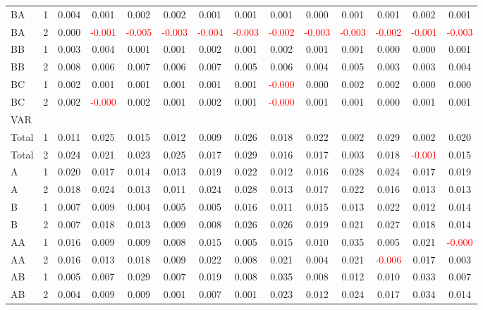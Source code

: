 \begin{table}[!htb]
{\begin{tabular}{llcccccccccccc}
BA & 1 & 0.004 & 0.001 & 0.002 & 0.002 & 0.001 & 0.001 & 0.001 & 0.000 & 0.001 & 0.001 & 0.002 & 0.001\\
BA & 2 & 0.000 & \textcolor{red}{-0.001} & \textcolor{red}{-0.005} & \textcolor{red}{-0.003} & \textcolor{red}{-0.004} & \textcolor{red}{-0.003} & \textcolor{red}{-0.002} & \textcolor{red}{-0.003} & \textcolor{red}{-0.003} & \textcolor{red}{-0.002} & \textcolor{red}{-0.001} & \textcolor{red}{-0.003}\\
BB & 1 & 0.003 & 0.004 & 0.001 & 0.001 & 0.002 & 0.001 & 0.002 & 0.001 & 0.001 & 0.000 & 0.000 & 0.001\\
BB & 2 & 0.008 & 0.006 & 0.007 & 0.006 & 0.007 & 0.005 & 0.006 & 0.004 & 0.005 & 0.003 & 0.003 & 0.004\\
BC & 1 & 0.002 & 0.001 & 0.001 & 0.001 & 0.001 & 0.001 & \textcolor{red}{-0.000} & 0.000 & 0.002 & 0.002 & 0.000 & 0.000\\
BC & 2 & 0.002 & \textcolor{red}{-0.000} & 0.002 & 0.001 & 0.002 & 0.001 & \textcolor{red}{-0.000} & 0.001 & 0.001 & 0.000 & 0.001 & 0.001\\
\hline
VAR &  &  &  &  &  &  &  &  &  &  &  &  & \\
\hline
Total & 1 & 0.011 & 0.025 & 0.015 & 0.012 & 0.009 & 0.026 & 0.018 & 0.022 & 0.002 & 0.029 & 0.002 & 0.020\\
Total & 2 & 0.024 & 0.021 & 0.023 & 0.025 & 0.017 & 0.029 & 0.016 & 0.017 & 0.003 & 0.018 & \textcolor{red}{-0.001} & 0.015\\
A & 1 & 0.020 & 0.017 & 0.014 & 0.013 & 0.019 & 0.022 & 0.012 & 0.016 & 0.028 & 0.024 & 0.017 & 0.019\\
A & 2 & 0.018 & 0.024 & 0.013 & 0.011 & 0.024 & 0.028 & 0.013 & 0.017 & 0.022 & 0.016 & 0.013 & 0.013\\
B & 1 & 0.007 & 0.009 & 0.004 & 0.005 & 0.005 & 0.016 & 0.011 & 0.015 & 0.013 & 0.022 & 0.012 & 0.014\\
B & 2 & 0.007 & 0.018 & 0.013 & 0.009 & 0.008 & 0.026 & 0.026 & 0.019 & 0.021 & 0.027 & 0.018 & 0.014\\
AA & 1 & 0.016 & 0.009 & 0.009 & 0.008 & 0.015 & 0.005 & 0.015 & 0.010 & 0.035 & 0.005 & 0.021 & \textcolor{red}{-0.000}\\
AA & 2 & 0.016 & 0.013 & 0.018 & 0.009 & 0.022 & 0.008 & 0.021 & 0.004 & 0.021 & \textcolor{red}{-0.006} & 0.017 & 0.003\\
AB & 1 & 0.005 & 0.007 & 0.029 & 0.007 & 0.019 & 0.008 & 0.035 & 0.008 & 0.012 & 0.010 & 0.033 & 0.007\\
AB & 2 & 0.004 & 0.009 & 0.009 & 0.001 & 0.007 & 0.001 & 0.023 & 0.012 & 0.024 & 0.017 & 0.034 & 0.014\\

\end{tabular}}
\end{table}
